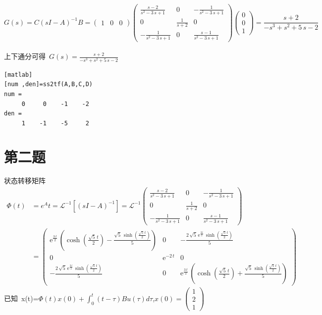 \documentclass[a4paper]{article}
\begin{document}
$$ G(s)=C(sI-A)^{-1}B = \left(\begin{array}{ccc} 1 & 0 & 0 \end{array}\right) \left(\begin{array}{ccc} \frac{s - 2}{s^2 - 3\, s + 1} & 0 & -\frac{1}{s^2 - 3\, s + 1}\\ 0 & \frac{1}{s + 2} & 0\\ -\frac{1}{s^2 - 3\, s + 1} & 0 & \frac{s - 1}{s^2 - 3\, s + 1} \end{array}\right) \left(\begin{array}{c} 0\\ 0\\ 1 \end{array}\right) =   \frac{s + 2}{ - s^3 + s^2 + 5\, s - 2} $$ \\
\mbox{上下通分可得 }$G(s)= \frac{s + 2}{ - s^3 + s^2 + 5\, s - 2} $
\begin{verbatim}[matlab]
[num ,den]=ss2tf(A,B,C,D)
num =
     0     0    -1    -2
den =
     1    -1    -5     2
\end{verbatim} 
\section*{第二题} 
状态转移矩阵
\begin{equation*} 
\begin{split}
\Phi(t) &= e^{A}t=\mathcal{L}^{-1}[(sI-A)^{-1}]=\mathcal{L}^{-1} \left(\begin{array}{ccc} \frac{s - 2}{s^2 - 3\, s + 1} & 0 & -\frac{1}{s^2 - 3\, s + 1}\\ 0 & \frac{1}{s + 2} & 0\\ -\frac{1}{s^2 - 3\, s + 1} & 0 & \frac{s - 1}{s^2 - 3\, s + 1} \end{array}\right) \\
&= \left(\begin{array}{ccc} \mathrm{e}^{\frac{3\, t}{2}}\, \left(\cosh\!\left(\frac{\sqrt{5}\, t}{2}\right) - \frac{\sqrt{5}\, \sinh\!\left(\frac{\sqrt{5}\, t}{2}\right)}{5}\right) & 0 & -\frac{2\, \sqrt{5}\, \mathrm{e}^{\frac{3\, t}{2}}\, \sinh\!\left(\frac{\sqrt{5}\, t}{2}\right)}{5}\\ 0 & \mathrm{e}^{- 2\, t} & 0\\ -\frac{2\, \sqrt{5}\, \mathrm{e}^{\frac{3\, t}{2}}\, \sinh\!\left(\frac{\sqrt{5}\, t}{2}\right)}{5} & 0 & \mathrm{e}^{\frac{3\, t}{2}}\, \left(\cosh\!\left(\frac{\sqrt{5}\, t}{2}\right) + \frac{\sqrt{5}\, \sinh\!\left(\frac{\sqrt{5}\, t}{2}\right)}{5}\right) \end{array}\right)
\end{split}
\end{equation*}
\mbox{已知 }x(t)=$\Phi(t)x(0)+\int^{t}_{0}(t-\tau)Bu(\tau)d\tau$,$x(0)= \left(\begin{array}{c} 1\\ 2\\ 1 \end{array}\right)$
\end{document}
